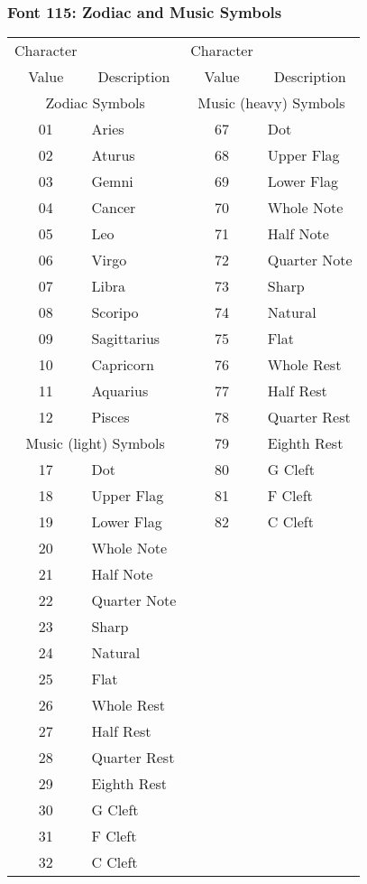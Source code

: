 \subsubsection{Font 115: Zodiac and Music Symbols}
\begin{tabular}{|c|l|c|l|}
\hline
\multicolumn{1}{|c|}{Character}
& & \multicolumn{1}{|c|}{Character}&\\
\multicolumn{1}{|c|}{Value}
&\multicolumn{1}{|c|}{Description}
&\multicolumn{1}{|c|}{Value}
&\multicolumn{1}{|c|}{Description}\\
\hline
\multicolumn{2}{|c|}{Zodiac Symbols}
&\multicolumn{2}{|c|}{Music (heavy) Symbols}\\
\hline
01 & Aries & 67 & Dot\\
02 & Aturus & 68 & Upper Flag\\
03 & Gemni & 69 & Lower Flag\\
04 & Cancer & 70 & Whole Note\\
05 & Leo & 71 & Half Note\\
06 & Virgo & 72 & Quarter Note\\
07 & Libra & 73 & Sharp\\
08 & Scoripo & 74 & Natural\\
09 & Sagittarius & 75 & Flat\\
10 & Capricorn & 76 & Whole Rest\\
11 & Aquarius & 77 & Half Rest\\
12 & Pisces & 78 & Quarter Rest\\
\cline{1-2}
\multicolumn{2}{|c|}{Music (light) Symbols} & 79 & Eighth Rest\\
\cline{1-2}
17 & Dot & 80 & G Cleft\\
18 & Upper Flag & 81 & F Cleft\\
19 & Lower Flag & 82 & C Cleft\\
20 & Whole Note&&\\
21 & Half Note&&\\
22 & Quarter Note&&\\
23 & Sharp&&\\
24 & Natural&&\\
25 & Flat&&\\
26 & Whole Rest&&\\
27 & Half Rest&&\\
28 & Quarter Rest&&\\
29 & Eighth Rest&&\\
30 & G Cleft&&\\
31 & F Cleft&&\\
32 & C Cleft&&\\ \hline
\end{tabular}
\newpage
